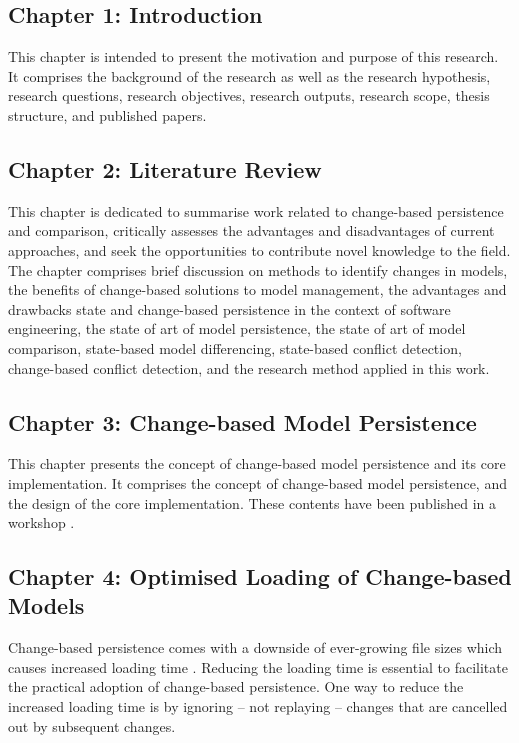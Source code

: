 \subsection{Chapter 1: Introduction}
\label{sec:chapter_1_introduction_plan}
This chapter is intended to present the motivation and purpose of this research. It comprises the background of the research as well as the research hypothesis, research questions, research objectives, research outputs, research scope, thesis structure, and published papers. 

\subsection{Chapter 2: Literature Review}
\label{sec:chapter_2_literature_review_plan}
This chapter is dedicated to summarise work related to change-based persistence and comparison, critically assesses the advantages and disadvantages of current approaches, and seek the opportunities to contribute novel knowledge to the field. The chapter comprises brief discussion on methods to identify changes in models, the benefits of change-based solutions to model management, the advantages and drawbacks state and change-based persistence in the context of software engineering, the state of art of model persistence, the state of art of model comparison, state-based model differencing, state-based conflict detection, change-based conflict detection, and the research method applied in this work.

\subsection{Chapter 3: Change-based Model Persistence}
\label{sec:chapter_3_Change-based_model_ersistence_plan}
This chapter presents the concept of change-based model persistence and its core implementation. It comprises the concept of change-based model persistence, and the design of the core implementation. These contents have been published in a workshop \cite{DBLP:conf/models/YohannisKP17}.


\subsection{Chapter 4: Optimised Loading of Change-based Models}
\label{sec:chapter_4_optimised_loading_change_based_model_persistence}

Change-based persistence comes with a downside of ever-growing file sizes \cite{DBLP:journals/entcs/RobbesL07,DBLP:conf/edoc/KoegelHLHD10} which causes increased loading time \cite{mens2002state}. Reducing the loading time is essential to facilitate the practical adoption of change-based persistence. One way to reduce the increased loading time is by ignoring -- not replaying -- changes that are cancelled out by subsequent changes. 

